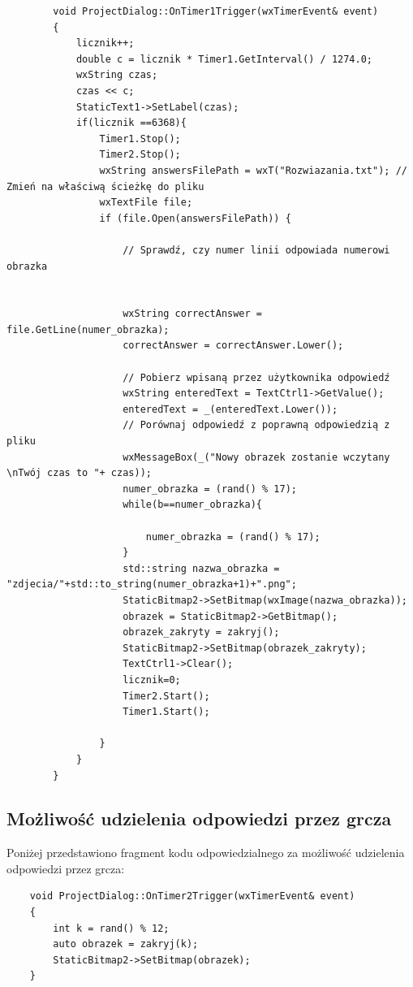 \documentclass{article}
\begin{document}
	\begin{lstlisting}
		void ProjectDialog::OnTimer1Trigger(wxTimerEvent& event)
		{
			licznik++;
			double c = licznik * Timer1.GetInterval() / 1274.0;
			wxString czas;
			czas << c;
			StaticText1->SetLabel(czas);
			if(licznik ==6368){
				Timer1.Stop();
				Timer2.Stop();
				wxString answersFilePath = wxT("Rozwiazania.txt"); // Zmień na właściwą ścieżkę do pliku
				wxTextFile file;
				if (file.Open(answersFilePath)) {
					
					// Sprawdź, czy numer linii odpowiada numerowi obrazka
					
					
					wxString correctAnswer = file.GetLine(numer_obrazka);
					correctAnswer = correctAnswer.Lower();
					
					// Pobierz wpisaną przez użytkownika odpowiedź
					wxString enteredText = TextCtrl1->GetValue();
					enteredText = _(enteredText.Lower());
					// Porównaj odpowiedź z poprawną odpowiedzią z pliku
					wxMessageBox(_("Nowy obrazek zostanie wczytany \nTwój czas to "+ czas));
					numer_obrazka = (rand() % 17);
					while(b==numer_obrazka){
						
						numer_obrazka = (rand() % 17);
					}
					std::string nazwa_obrazka = "zdjecia/"+std::to_string(numer_obrazka+1)+".png";
					StaticBitmap2->SetBitmap(wxImage(nazwa_obrazka));
					obrazek = StaticBitmap2->GetBitmap();
					obrazek_zakryty = zakryj();
					StaticBitmap2->SetBitmap(obrazek_zakryty);
					TextCtrl1->Clear();
					licznik=0;
					Timer2.Start();
					Timer1.Start();
					
				}
			}
		}
	\end{lstlisting}
	
	\subsection{Możliwość udzielenia odpowiedzi przez grcza}
	Poniżej przedstawiono fragment kodu odpowiedzialnego za możliwość udzielenia odpowiedzi przez grcza:
	\begin{lstlisting}
	void ProjectDialog::OnTimer2Trigger(wxTimerEvent& event)
	{
		int k = rand() % 12;
		auto obrazek = zakryj(k);
		StaticBitmap2->SetBitmap(obrazek);
	}
	\end{lstlisting}
	
\end{document}

